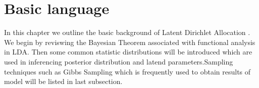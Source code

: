 \chapter{Basic language}
In this chapter we outline the basic background of Latent Dirichlet Allocation
. We begin by reviswing the Bayesian Theorem
associated with functional analysis in LDA. Then some common statistic distributions
 will be introduced which are used in inferencing posterior distribution and latend parameters.Sampling techniques such as Gibbs Sampling which is frequently used to obtain results of model will be listed in last subsection.
